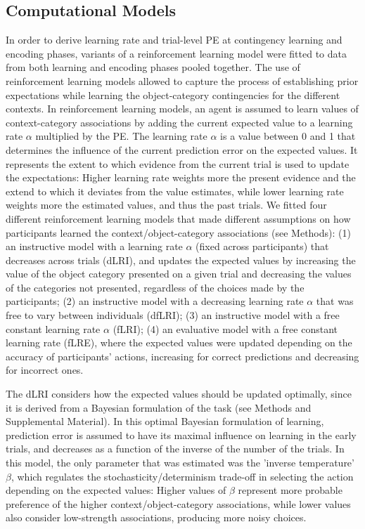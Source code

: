 \documentclass[a4paper,12pt]{article}
\begin{document}
\subsection{Computational Models}
In order to derive learning rate and trial-level PE at contingency learning and encoding phases, variants of a reinforcement learning model \citep{Sutton2018a} were fitted to data from both learning and encoding phases pooled together. The use of reinforcement learning models allowed to capture the process of establishing prior expectations while learning the object-category contingencies for the different contexts. In reinforcement learning models, an agent is assumed to learn values of context-category associations by adding the current expected value to a learning rate $\alpha$ multiplied by the PE. The learning rate $\alpha$ is a value between 0 and 1 that determines the influence of the current prediction error on the expected values. It represents the extent to which evidence from the current trial is used to update the expectations: Higher learning rate weights more the present evidence and the extend to which it deviates from the value estimates, while lower learning rate weights more the estimated values, and thus the past trials.  We fitted four different reinforcement learning models that made different assumptions on how participants learned the context/object-category associations (see Methods): (1) an instructive model with a learning rate $\alpha$ (fixed across participants) that decreases across trials (dLRI), and updates the expected values by increasing the value of the object category presented on a given trial and decreasing the values of the categories not presented, regardless of the choices made by the participants; (2) an instructive model with a decreasing learning rate  $\alpha$ that was free to vary between individuals (dfLRI); (3) an instructive model with a free constant learning rate $\alpha$ (fLRI); (4) an evaluative model with a free constant learning rate (fLRE), where the expected values were updated depending on the accuracy of participants' actions, increasing for correct predictions and decreasing for incorrect ones. \par
The dLRI considers how the expected values should be updated optimally, since it is derived from a Bayesian formulation of the task (see Methods and Supplemental Material). In this optimal Bayesian formulation of learning, prediction error is assumed to have its maximal influence on learning in the early trials, and decreases as a function of the inverse of the number of the trials. In this model, the only parameter that was estimated was the 'inverse temperature' $\beta$, which regulates the stochasticity/determinism trade-off in selecting the action depending on the expected values: Higher values of $\beta$ represent more probable preference of the higher context/object-category associations, while lower values also consider low-strength associations, producing more noisy choices. \par
\end{document}
